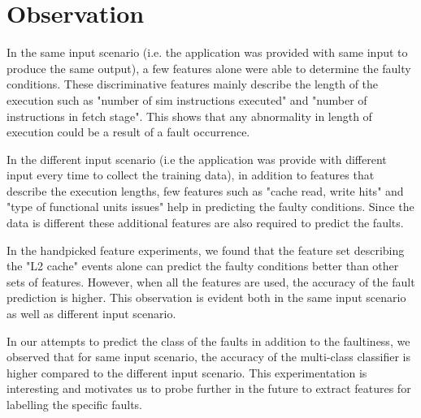 \section{Observation}
In the same input scenario (i.e. the application was provided with same input to produce the same output), a few features alone were able to determine the faulty conditions. These discriminative features mainly describe the length of the execution such as "number of sim instructions executed" and "number of instructions in fetch stage". This shows that any abnormality in length of execution could be a result of a fault occurrence. 

In the different input scenario (i.e the application was provide with different input every time to collect the training data), in addition to features that describe the execution lengths, few features such as "cache read, write hits" and "type of functional units issues" help in predicting the faulty conditions. Since the data is different these additional features are also required to predict the faults. 

In the handpicked feature experiments, we found that the feature set describing the "L2 cache" events alone can predict the faulty conditions better than other sets of features. However, when all the features are used, the accuracy of the fault prediction is higher. This observation is evident both in the same input scenario as well as different input scenario. 

In our attempts to predict the class of the faults in addition to the faultiness, we observed that for same input scenario, the accuracy of the multi-class classifier is higher compared to the different input scenario. This experimentation is interesting and motivates us to probe further in the future to extract features for labelling the specific faults.